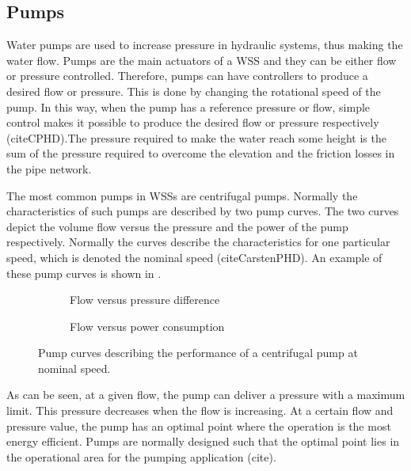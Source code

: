 \subsection{Pumps}
\label{pumps}

Water pumps are used to increase pressure in hydraulic systems, thus making the water flow. Pumps are the main actuators of a WSS and they can be either flow or pressure controlled. Therefore, pumps can have controllers to produce a desired flow or pressure. This is done by changing the rotational speed of the pump. In this way, when the pump has a reference pressure or flow, simple control makes it possible to produce the desired flow or pressure respectively (citeCPHD).The pressure required to make the water reach some height is the sum of the pressure required to overcome the elevation and the friction losses in the pipe network. 

The most common pumps in WSSs are centrifugal pumps. Normally the characteristics of such pumps are described by two pump curves. The two curves depict the volume flow versus the pressure and the power of the pump respectively. Normally the curves describe the characteristics for one particular speed, which is denoted the nominal speed (citeCarstenPHD). An example of these pump curves is shown in .

\begin{figure}[H]
\centering
\begin{subfigure}{.49\textwidth}
\centering
   
  \caption{Flow versus pressure difference}
  \label{fig:sub1}
\end{subfigure}
\begin{subfigure}{.49\textwidth}
\centering
   
  \caption{Flow versus power consumption}
  \label{fig:sub2}
\end{subfigure}
\caption{Pump curves describing the performance of a centrifugal pump at nominal speed.}
\label{fig:pump_curves}
\end{figure}

%  

As can be seen, at a given flow, the pump can deliver a pressure with a maximum limit. This pressure decreases when the flow is increasing. At a certain flow and pressure value, the pump has an optimal point where the operation is the most energy efficient. Pumps are normally designed such that the optimal point lies in the operational area for the pumping application (cite). 

